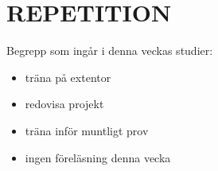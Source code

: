 \chapter{REPETITION}\label{chapter:W13}
Begrepp som ingår i denna veckas studier:
\begin{itemize}[noitemsep,label={$\square$},leftmargin=*]
\item träna på extentor
\item redovisa projekt
\item träna inför muntligt prov
\item ingen föreläsning denna vecka\end{itemize}
